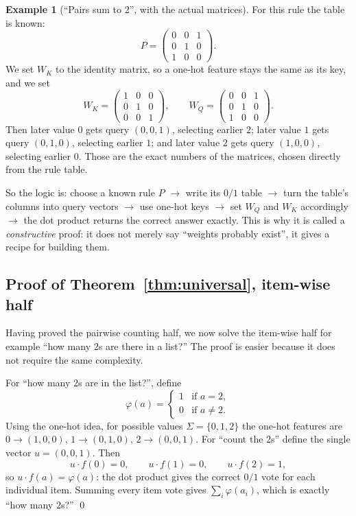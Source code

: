 \documentclass[10pt]{article}
\theoremstyle{definition}
\newtheorem{example}{Example}
\begin{document}
\begin{appendices}
\begin{example}[``Pairs sum to $2$'', with the actual matrices]
\label{ex:sumto2}
For this rule the table is known:
\[
P = \begin{pmatrix} 0 & 0 & 1 \\ 0 & 1 & 0 \\ 1 & 0 & 0 \end{pmatrix}.
\]
We set $W_K$ to the identity matrix, so a one-hot feature stays the same
as its key, and we set
\[
W_K = \begin{pmatrix} 1&0&0 \\ 0&1&0 \\ 0&0&1 \end{pmatrix},
\qquad
W_Q = \begin{pmatrix} 0&0&1 \\ 0&1&0 \\ 1&0&0 \end{pmatrix}.
\]
Then later value $0$ gets query $(0,0,1)$, selecting earlier $2$; later
value $1$ gets query $(0,1,0)$, selecting earlier $1$; and later value $2$
gets query $(1,0,0)$, selecting earlier $0$. Those are the exact numbers
of the matrices, chosen directly from the rule table.
\end{example}

So the logic is: choose a known rule $P$ $\rightarrow$ write its $0/1$
table $\rightarrow$ turn the table's columns into query vectors
$\rightarrow$ use one-hot keys $\rightarrow$ set $W_Q$ and $W_K$
accordingly $\rightarrow$ the dot product returns the correct answer
exactly. This is why it is called a \emph{constructive} proof: it does not
merely say ``weights probably exist'', it gives a recipe for building
them.

\subsection{Proof of Theorem~\ref{thm:universal}, item-wise half}
\label{sec:proof-item}

Having proved the pairwise counting half, we now solve the item-wise half
for example ``how many $2$s are there in a list?'' The proof is
easier because it does not require the same complexity.

For ``how many $2$s are in the list?'', define
\[
\varphi(a) = \begin{cases} 1 & \text{if } a = 2,\\ 0 & \text{if } a \neq 2.\end{cases}
\]
Using the one-hot idea, for possible values $\Sigma = \{0,1,2\}$ the
one-hot features are $0 \rightarrow (1,0,0)$, $1 \rightarrow (0,1,0)$,
$2 \rightarrow (0,0,1)$. For ``count the $2$s'' define the single vector
$u = (0,0,1)$. Then
\[
u \cdot f(0) = 0, \qquad u \cdot f(1) = 0, \qquad u \cdot f(2) = 1,
\]
so $u \cdot f(a) = \varphi(a)$: the dot product gives the correct $0/1$
vote for each individual item. Summing every item vote gives
$\sum_i \varphi(a_i)$, which is exactly ``how many $2$s?'' \qed


\end{appendices}
\end{document}
